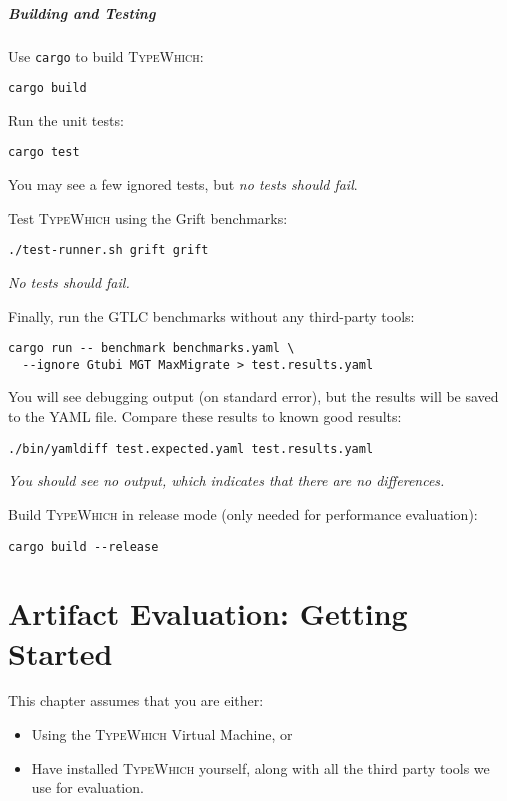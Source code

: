 \documentclass{book}
\newcommand{\system}{\textsc{TypeWhich}\xspace}
\begin{document}
\paragraph{Building and Testing}

Use \texttt{cargo} to build \system:

\begin{verbatim}
cargo build
\end{verbatim}

Run the unit tests:
\begin{verbatim}
cargo test
\end{verbatim}
You may see a few ignored tests, but \emph{no tests should fail}.

Test \system using the Grift benchmarks:
\begin{verbatim}
./test-runner.sh grift grift
\end{verbatim}
\emph{No tests should fail.}

Finally, run the GTLC benchmarks without any third-party tools:
\begin{verbatim}
cargo run -- benchmark benchmarks.yaml \
  --ignore Gtubi MGT MaxMigrate > test.results.yaml
\end{verbatim}
You will see debugging output (on standard error), but the results will
be saved to the YAML file. Compare these results to known good results:
\begin{verbatim}
./bin/yamldiff test.expected.yaml test.results.yaml
\end{verbatim}
\emph{You should see no output, which indicates that there are no
differences.}

Build \system in release mode (only needed for performance evaluation):

\begin{verbatim}
cargo build --release
\end{verbatim}

\chapter{Artifact Evaluation: Getting Started}
\label{getting-started} 

This chapter assumes that you are either:

\begin{itemize}

     \item Using the \system Virtual Machine, or
     \item Have installed \system yourself, along with all the third party
     tools we use for evaluation.

\end{itemize}
\end{document}
